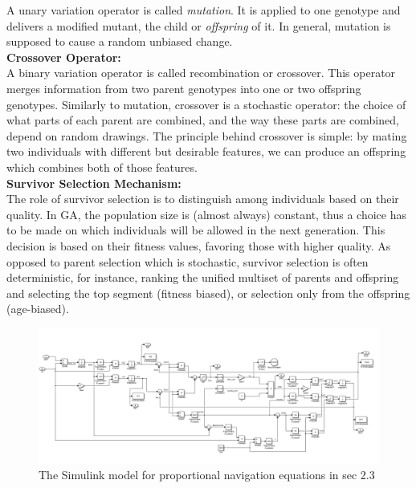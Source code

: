 A unary variation operator is called \textit{mutation}. It is applied to one genotype and delivers a modified mutant, the child or \textit{offspring} of it.
In general, mutation is supposed to cause a random unbiased change. 
\\
\textbf{Crossover Operator:}\\
A binary variation operator is called recombination or crossover. This operator merges information from two parent genotypes into one or two offspring genotypes.
Similarly to mutation, crossover is a stochastic operator: the choice of what parts of each parent are combined, and the way these parts are combined, depend on random drawings.
The principle behind crossover is simple: by mating two individuals with different but desirable features, we can produce an offspring which combines both of those features.
\\
\textbf{Survivor Selection Mechanism:}\\
The role of survivor selection is to distinguish among individuals based on their quality. In GA, the population size is (almost always) constant, thus a choice has to be made on which individuals will be allowed in the next generation. This decision is based on their fitness values, favoring those with higher quality.
As opposed to parent selection which is stochastic, survivor selection is often deterministic, for instance, ranking the unified multiset of parents and offspring and selecting the top segment (fitness biased), or selection only from the offspring (age-biased).
\\


\begin{landscape}
	\begin{figure}[H]
		\centering
		\includegraphics[scale = 0.70]{fig/PNeq.PNG}
		\caption{The Simulink model for proportional navigation equations in sec 2.3}
		\label{PN eq}
	\end{figure}
\end{landscape}


